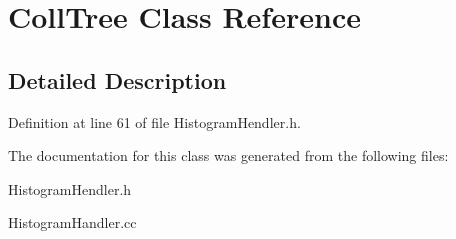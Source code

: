 \section{Coll\-Tree Class Reference}
\label{classCollTree}


\subsection{Detailed Description}


Definition at line 61 of file Histogram\-Hendler.\-h.



The documentation for this class was generated from the following files\-:\begin{DoxyCompactItemize}
\item 
Histogram\-Hendler.\-h\item 
Histogram\-Handler.\-cc\end{DoxyCompactItemize}

